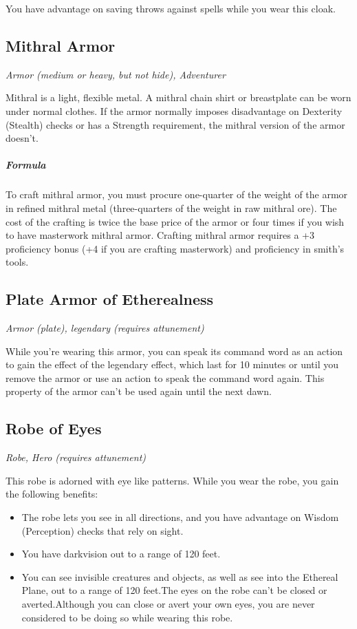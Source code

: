 You have advantage on saving throws against spells while you wear this cloak.

\subsection{Mithral Armor}
\textit{Armor (medium or heavy, but not hide), Adventurer}

Mithral is a light, flexible metal. A mithral chain shirt or breastplate can be worn under normal clothes. If the armor normally imposes disadvantage on Dexterity (Stealth) checks or has a Strength requirement, the mithral version of the armor doesn't.

\subparagraph*{Formula} To craft mithral armor, you must procure one-quarter of the weight of the armor in refined mithral metal (three-quarters of the weight in raw mithral ore). The cost of the crafting is twice the base price of the armor or four times if you wish to have masterwork mithral armor. Crafting mithral armor requires a +3 proficiency bonus (+4 if you are crafting masterwork) and proficiency in smith's tools.

\subsection{Plate Armor of Etherealness}
\textit{Armor (plate), legendary (requires attunement)}

While you're wearing this armor, you can speak its command word as an action to gain the effect of the  legendary effect, which last for 10 minutes or until you remove the armor or use an action to speak the command word again. This property of the armor can't be used again until the next dawn.

\subsection{Robe of Eyes}
\textit{Robe, Hero (requires attunement)}

This robe is adorned with eye like patterns. While you wear the robe, you gain the following benefits:
\begin{itemize}
 \item The robe lets you see in all directions, and you have advantage on Wisdom (Perception) checks that rely on sight.
 \item You have darkvision out to a range of 120 feet.
 \item You can see invisible creatures and objects, as well as see into the Ethereal Plane, out to a range of 120 feet.The eyes on the robe can't be closed or averted.Although you can close or avert your own eyes, you are never considered to be doing so while wearing this robe.
\end{itemize}

